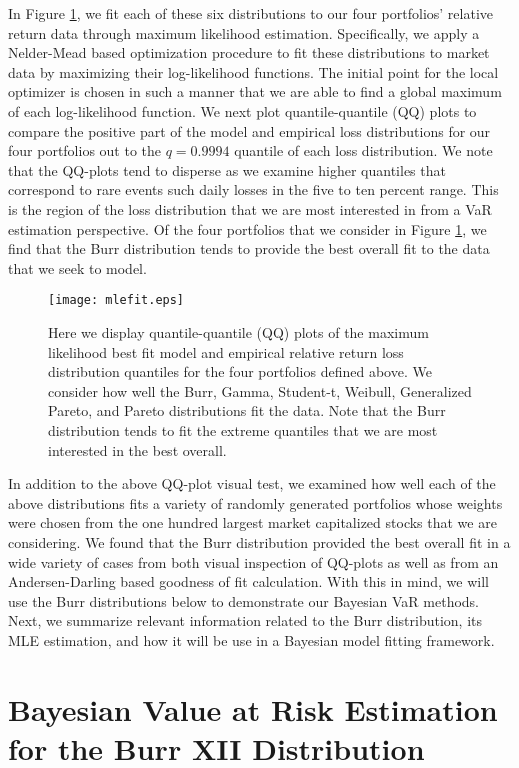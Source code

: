 \documentclass{amsart}
\begin{document}
In Figure \ref{mlefit}, we fit each of these six distributions to our four portfolios' relative 
return data through maximum likelihood estimation. Specifically, we apply a Nelder-Mead based optimization 
procedure to fit these distributions to market data by maximizing their log-likelihood functions. 
The initial point for the local optimizer is chosen in such a manner that we are able to 
find a global maximum of each log-likelihood function.
We next plot quantile-quantile (QQ) plots to compare the positive part of the 
model and empirical loss distributions for our four portfolios out to 
the $q=0.9994$ quantile of each loss distribution. 
We note that the QQ-plots tend to disperse as we examine higher quantiles that correspond 
to rare events such daily losses in the five to ten percent range. This is the region of the loss 
distribution
that we are most interested in from a VaR estimation perspective.
Of the four portfolios that we consider in Figure \ref{mlefit}, we find that the Burr  
distribution tends to provide the best overall fit to the data that we seek to model.  
%
\begin{figure}[h!]
    \centering
    \texttt{[image: mlefit.eps]}
    \caption{Here we display quantile-quantile (QQ) plots of the maximum likelihood best fit model
    and empirical relative return loss distribution quantiles for the four 
    portfolios defined above. We consider how well the Burr, Gamma, Student-t, Weibull,
    Generalized Pareto, and Pareto distributions fit the data.
    Note that the Burr distribution tends to fit the 
    extreme quantiles that we are most interested in the best overall.}
    \label{mlefit}
\end{figure}
%
In addition to the above QQ-plot visual test, we examined how well each of the above distributions 
fits a variety of randomly generated portfolios whose weights were chosen  
from the one hundred largest market capitalized stocks that we are considering.
We found that the Burr distribution provided the best overall fit in a wide 
variety of cases from both visual inspection of QQ-plots as well as 
from an Andersen-Darling based goodness of fit calculation.
With this in mind, we will use the Burr distributions below to demonstrate our Bayesian 
VaR methods.  Next, we summarize 
relevant information related to the Burr distribution, its MLE estimation, and how it will be use in  
a Bayesian model fitting framework.

\section{Bayesian Value at Risk Estimation for the Burr XII Distribution} 
\end{document}
